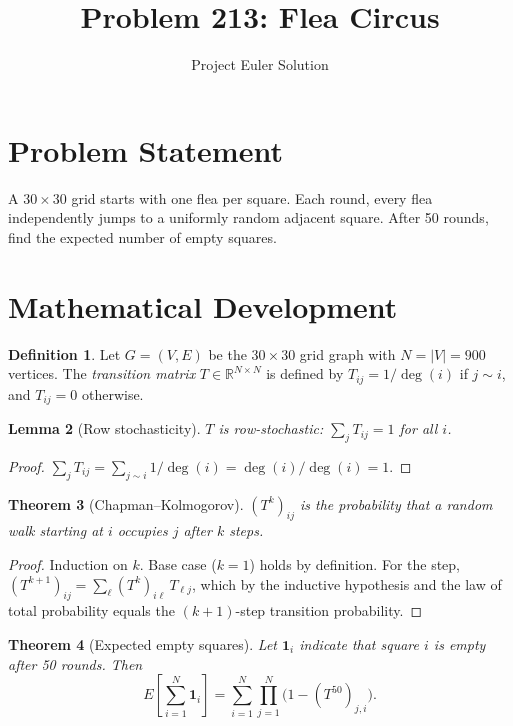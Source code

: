 \documentclass[12pt]{article}
\title{Problem 213: Flea Circus}
\author{Project Euler Solution}
\date{}
\newtheorem{theorem}{Theorem}
\newtheorem{lemma}[theorem]{Lemma}
\theoremstyle{definition}
\newtheorem{definition}[theorem]{Definition}
\theoremstyle{remark}
\begin{document}
\maketitle

\section{Problem Statement}

A $30 \times 30$ grid starts with one flea per square. Each round, every flea independently jumps to a uniformly random adjacent square. After 50 rounds, find the expected number of empty squares.

\section{Mathematical Development}

\begin{definition}
Let $G = (V,E)$ be the $30\times 30$ grid graph with $N = |V| = 900$ vertices. The \emph{transition matrix} $T \in \mathbb{R}^{N\times N}$ is defined by $T_{ij} = 1/\deg(i)$ if $j \sim i$, and $T_{ij} = 0$ otherwise.
\end{definition}

\begin{lemma}[Row stochasticity]
$T$ is row-stochastic: $\sum_j T_{ij} = 1$ for all $i$.
\end{lemma}

\begin{proof}
$\sum_j T_{ij} = \sum_{j \sim i} 1/\deg(i) = \deg(i)/\deg(i) = 1$.
\end{proof}

\begin{theorem}[Chapman--Kolmogorov]
$(T^k)_{ij}$ is the probability that a random walk starting at $i$ occupies $j$ after $k$ steps.
\end{theorem}

\begin{proof}
Induction on $k$. Base case ($k=1$) holds by definition. For the step, $(T^{k+1})_{ij} = \sum_\ell (T^k)_{i\ell}\,T_{\ell j}$, which by the inductive hypothesis and the law of total probability equals the $(k{+}1)$-step transition probability.
\end{proof}

\begin{theorem}[Expected empty squares]
Let $\mathbf{1}_i$ indicate that square $i$ is empty after 50 rounds. Then
\[
E\!\left[\sum_{i=1}^{N}\mathbf{1}_i\right] = \sum_{i=1}^{N}\prod_{j=1}^{N}\bigl(1 - (T^{50})_{j,i}\bigr).
\]
\end{theorem}
\end{document}
